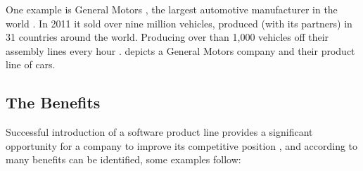 One example is General Motors , the largest automotive manufacturer in the world \citep{GmTop2012}. In 2011 it sold over nine million vehicles, produced (with its partners) in 31 countries around the world. Producing over than 1,000 vehicles off their assembly lines every hour \citep{rafael2013systems}.  depicts a General Motors company and their product line of cars.


\subsection{The Benefits}

Successful introduction of a software product line provides a significant opportunity for a company to improve its competitive position \citep{rafael2013systems} , and according to \citep{ clements2002software,Pohl2005, rafael2013systems} many benefits can be identified, some examples follow:
